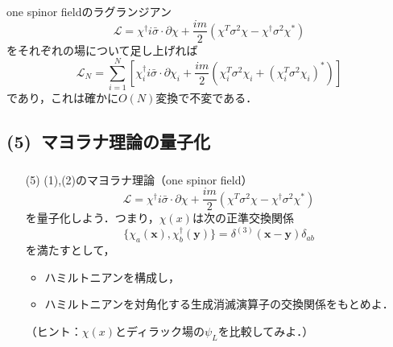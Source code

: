 \documentclass[pdflatex,unicode,ja=standard,12pt]{beamer}
\begin{document}
\begin{frame}
  
  \frametitle{\subsecname}

  one spinor fieldのラグランジアン
  \begin{equation}    
    \mathcal{L}
    =
    \chi^{\dag}i\bar{\sigma}\cdot\partial\chi
    +
    \frac{im}{2}(\chi^{T}\sigma^{2}\chi-\chi^{\dag}\sigma^2\chi^{*})
    \nonumber
  \end{equation}
  をそれぞれの場について足し上げれば
  \begin{equation}
    \mathcal{L}_N
    =
    \sum_{i=1}^{N}
    \left[  
      \chi_i^{\dag}i\bar{\sigma}\cdot\partial\chi_i
      +
      \frac{im}{2}(\chi_i^{T}\sigma^{2}\chi_i+(\chi_i^{T}\sigma^2\chi_i)^{*})
    \right]
    \label{L_ON}
  \end{equation}
  であり，これは確かに$O(N)$変換で不変である．

\end{frame}



\subsection{(5)\ マヨラナ理論の量子化}

\begin{frame}
  
  \frametitle{\subsecname}
  
  \begin{itemize}    
    \item [(5)]    
    (1),(2)のマヨラナ理論（one spinor field）
    \begin{equation}
      \mathcal{L}
      =
      \chi^{\dag}i\bar{\sigma}\cdot\partial\chi
      +
      \frac{im}{2}(\chi^{T}\sigma^{2}\chi-\chi^{\dag}\sigma^2\chi^{*})
      \nonumber
    \end{equation}
    を量子化しよう．つまり，$\chi(x)$は次の正準交換関係
    \begin{equation}
      \{  
        \chi_a(\mathbf{x})
        ,
        \chi_b^{\dag}(\mathbf{y})
      \}
      =
      \delta^{(3)}(\mathbf{x}-\mathbf{y})\delta_{ab}
    \end{equation}
    を満たすとして，
    \begin{itemize}
      \item 
      ハミルトニアンを構成し，

      \item
      ハミルトニアンを対角化する生成消滅演算子の交換関係をもとめよ．
    \end{itemize}
    （ヒント：$\chi(x)$とディラック場の$\psi_L$を比較してみよ．）
  \end{itemize}

\end{frame}
\end{document}
